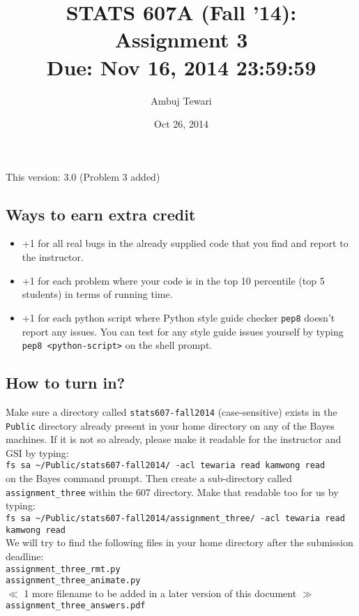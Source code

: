 \documentclass{article}
\begin{document}
\author{Ambuj Tewari}
\title{STATS 607A (Fall '14): Assignment 3\\
Due: Nov 16, 2014 23:59:59}
\date{Oct 26, 2014}

\maketitle

\begin{center}
This version: 3.0 (Problem 3 added)
\end{center}

\subsection*{Ways to earn extra credit}

\begin{itemize}
\item +1 for all real bugs in the already supplied code that you find and report to the instructor.
\item +1 for each problem where your code is in the top 10 percentile (top 5 students) in terms of running time.
\item +1 for each python script where Python style guide checker {\tt pep8} doesn't report any issues. You can test for any style guide issues yourself by typing
{\tt pep8 <python-script>} on the shell prompt.

\end{itemize}

\subsection*{How to turn in?}

Make sure a directory called {\tt stats607-fall2014} (case-sensitive) exists in the {\tt Public} directory already present in your home directory on any of the Bayes machines.
If it is not so already, please make it readable for the instructor and GSI by typing:\\
\verb#fs sa ~/Public/stats607-fall2014/ -acl tewaria read kamwong read# \\
on the Bayes command prompt. Then create a sub-directory called {\tt
assignment\_three} within the 607 directory. Make that readable too for us by typing:\\
\verb#fs sa ~/Public/stats607-fall2014/assignment_three/ -acl tewaria read kamwong read# \\
We will try to find the
following files in your home directory after the submission deadline:\\
{\tt assignment\_three\_rmt.py} \\
{\tt assignment\_three\_animate.py} \\
$\ll$ 1 more filename to be added in a later version of this document $\gg$\\
{\tt assignment\_three\_answers.pdf} \\
\end{document}
